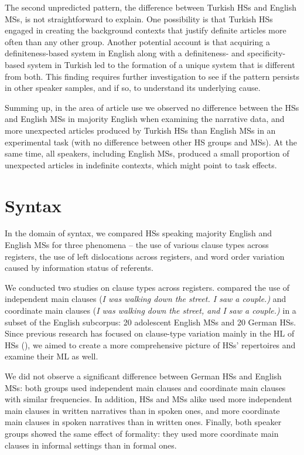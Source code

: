 \documentclass[output=paper,colorlinks,citecolor=brown]{langscibook}
\begin{document}
The second unpredicted pattern, the difference between Turkish HSs and English MSs, is not straightforward to explain. One possibility is that Turkish HSs engaged in creating the background contexts that justify definite articles more often than any other group. Another potential account is that acquiring a definiteness\hyp based system in English along with a definiteness- and specificity-based system in Turkish led to the formation of a unique system that is different from both. This finding requires further investigation to see if the pattern persists in other speaker samples, and if so, to understand its underlying cause.

Summing up, in the area of article use we observed no difference between the HSs and English MSs in majority English when examining the narrative data, and more unexpected articles produced by Turkish HSs than English MSs in an experimental task (with no difference between other HS groups and MSs). At the same time, all speakers, including English MSs, produced a small proportion of unexpected articles in indefinite contexts, which might point to task effects.


\section{Syntax} \label{sec:pashkovaetal:Syntax}

In the domain of syntax, we compared HSs speaking majority English and English MSs for three phenomena – the use of various clause types across registers, the use of left dislocations across registers, and word order variation caused by information status of referents.

We conducted two studies on clause types across registers. \citet{pashkova2022} compared the use of independent main clauses (\textit{I was walking down the street. I saw a couple.)} and coordinate main clauses (\textit{I was walking down the street, and I saw a couple.)} in a subset of the English subcorpus: 20 adolescent English MSs and 20 German HSs. Since previous research has focused on clause-type variation mainly in the HL of HSs (\cite{chapters/09, Ozsoy2022, schleppegrell1997, sanchez_abchi2017}), we aimed to create a more comprehensive picture of HSs’ repertoires and examine their ML as well.

We did not observe a significant difference between German HSs and English MSs: both groups used independent main clauses and coordinate main clauses with similar frequencies. In addition, HSs and MSs alike used more independent main clauses in written narratives than in spoken ones, and more coordinate main clauses in spoken narratives than in written ones. Finally, both speaker groups showed the same effect of formality: they used more coordinate main clauses in informal settings than in formal ones.
\end{document}
